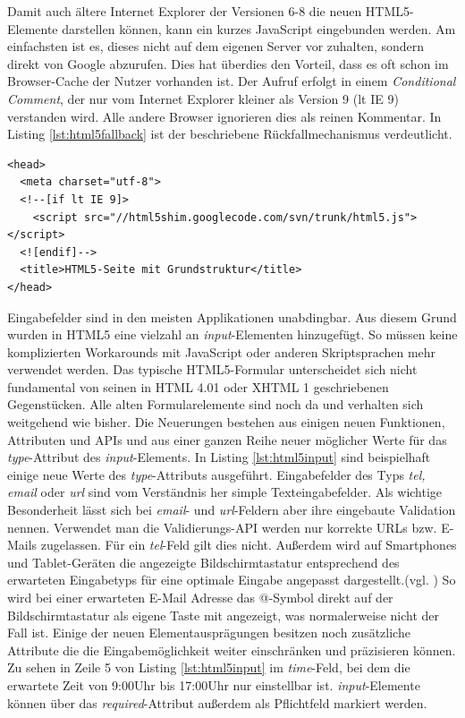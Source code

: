\documentclass[12pt,a4paper,bibliography=totocnumbered,listof=totocnumbered]{scrartcl}
\begin{document}
\glqq Damit auch ältere Internet Explorer der Versionen 6-8 die neuen HTML5-Elemente darstellen können, kann ein kurzes JavaScript eingebunden werden. Am einfachsten ist es, dieses nicht auf dem eigenen Server vor zuhalten, sondern direkt von Google abzurufen. Dies hat überdies den Vorteil, dass es oft schon im Browser-Cache der Nutzer vorhanden ist. Der Aufruf erfolgt in einem \textit{Conditional Comment}, der nur vom Internet Explorer kleiner als Version 9 (lt IE 9) verstanden wird. Alle andere Browser ignorieren dies als reinen Kommentar.\grqq{}\cite{SelfHtml20143} In Listing \ref{lst:html5fallback}	 ist der beschriebene Rückfallmechanismus verdeutlicht.

    \vspace{1em}
	\begin{lstlisting}[caption=HTML5 Internet Explorer Fallback, label=lst:html5fallback]
<head>
  <meta charset="utf-8">
  <!--[if lt IE 9]>
    <script src="//html5shim.googlecode.com/svn/trunk/html5.js"></script>
  <![endif]-->
  <title>HTML5-Seite mit Grundstruktur</title>
</head>
	\end{lstlisting}
	
Eingabefelder sind in den meisten Applikationen unabdingbar. Aus diesem Grund wurden in HTML5 eine vielzahl an \textit{input}-Elementen hinzugefügt. So müssen keine komplizierten Workarounds mit JavaScript oder anderen Skriptsprachen mehr verwendet werden. \glqq Das typische HTML5-Formular unterscheidet sich nicht fundamental von seinen in HTML 4.01 oder XHTML 1 geschriebenen Gegenstücken. Alle alten Formularelemente sind noch da und verhalten sich weitgehend wie bisher. Die Neuerungen bestehen aus einigen neuen Funktionen, Attributen und \ac{API}s und aus einer ganzen Reihe neuer möglicher Werte für das \textit{type}-Attribut des \textit{input}-Elements.\grqq{}\cite[S.176]{KronHTML2011} In Listing \ref{lst:html5input} sind beispielhaft einige neue Werte des \textit{type}-Attributs ausgeführt. Eingabefelder des Typs \textit{tel, email} oder \textit{url} sind vom Verständnis her simple Texteingabefelder. Als wichtige Besonderheit lässt sich bei \textit{email}- und \textit{url}-Feldern aber ihre eingebaute Validation nennen. Verwendet man die Validierungs-\ac{API} werden nur korrekte URLs bzw. E-Mails zugelassen. Für ein \textit{tel}-Feld gilt dies nicht. Außerdem wird auf Smartphones und Tablet-Geräten die angezeigte Bildschirmtastatur entsprechend des erwarteten Eingabetyps für eine optimale Eingabe angepasst dargestellt.(vgl. \cite[S.178]{KronHTML2011}) So wird bei einer erwarteten E-Mail Adresse das @-Symbol direkt auf der Bildschirmtastatur als eigene Taste mit angezeigt, was normalerweise nicht der Fall ist. Einige der neuen Elementausprägungen besitzen noch zusätzliche Attribute die die Eingabemöglichkeit weiter einschränken und präzisieren können. Zu sehen in Zeile 5 von Listing \ref{lst:html5input} im \textit{time}-Feld, bei dem die erwartete Zeit von 9:00Uhr bis 17:00Uhr nur einstellbar ist. \textit{input}-Elemente können über das \textit{required}-Attribut außerdem als Pflichtfeld markiert werden.
\end{document}
